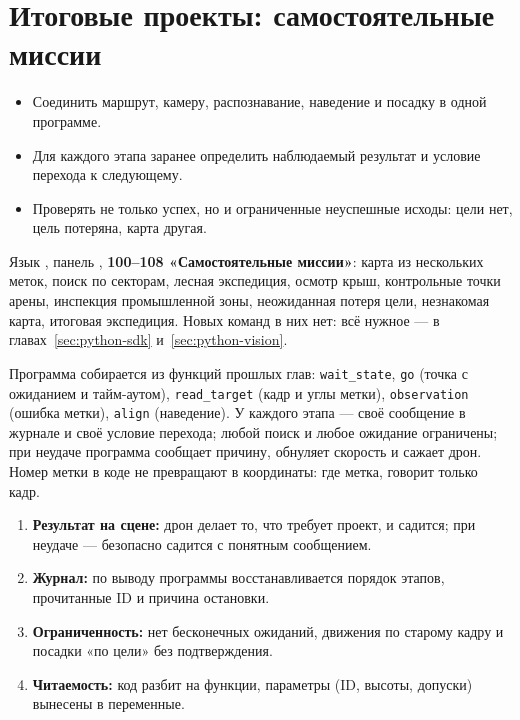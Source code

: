 \section{Итоговые проекты: самостоятельные миссии}
\label{sec:python-final}

\begin{infobox}
\begin{itemize}
    \item Соединить маршрут, камеру, распознавание, наведение и посадку в одной программе.
    \item Для каждого этапа заранее определить наблюдаемый результат и условие перехода к следующему.
    \item Проверять не только успех, но и ограниченные неуспешные исходы: цели нет, цель потеряна, карта другая.
\end{itemize}
\end{infobox}

\begin{missionbox}
Язык , панель , \textbf{100--108 «Самостоятельные миссии»}: карта из нескольких меток, поиск по секторам, лесная экспедиция, осмотр крыш, контрольные точки арены, инспекция промышленной зоны, неожиданная потеря цели, незнакомая карта, итоговая экспедиция. Новых команд в них нет: всё нужное --- в главах~\ref{sec:python-sdk} и~\ref{sec:python-vision}.
\end{missionbox}

\begin{rulebox}
Программа собирается из функций прошлых глав: \verb|wait_state|, \verb|go| (точка с ожиданием и тайм-аутом), \verb|read_target| (кадр и углы метки), \verb|observation| (ошибка метки), \verb|align| (наведение). У каждого этапа --- своё сообщение в журнале и своё условие перехода; любой поиск и любое ожидание ограничены; при неудаче программа сообщает причину, обнуляет скорость и сажает дрон. Номер метки в коде не превращают в координаты: где метка, говорит только кадр.
\end{rulebox}

\begin{infobox}
\begin{enumerate}
    \item \textbf{Результат на сцене:} дрон делает то, что требует проект, и садится; при неудаче --- безопасно садится с понятным сообщением.
    \item \textbf{Журнал:} по выводу программы восстанавливается порядок этапов, прочитанные ID и причина остановки.
    \item \textbf{Ограниченность:} нет бесконечных ожиданий, движения по старому кадру и посадки «по цели» без подтверждения.
    \item \textbf{Читаемость:} код разбит на функции, параметры (ID, высоты, допуски) вынесены в переменные.
\end{enumerate}
\end{infobox}

